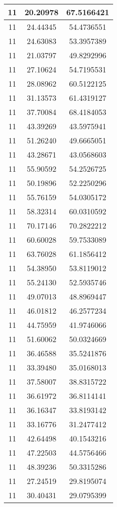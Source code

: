 \documentclass[
]{book}
\begin{document}
\begin{tabular}{c|c|c}
\hline
11 & 20.20978 & 67.5166421\\
\hline
11 & 24.44345 & 54.4736551\\
\hline
11 & 24.63083 & 53.3957389\\
\hline
11 & 21.03797 & 49.8292996\\
\hline
11 & 27.10624 & 54.7195531\\
\hline
11 & 28.08962 & 60.5122125\\
\hline
11 & 31.13573 & 61.4319127\\
\hline
11 & 37.70084 & 68.4184053\\
\hline
11 & 43.39269 & 43.5975941\\
\hline
11 & 51.26240 & 49.6665051\\
\hline
11 & 43.28671 & 43.0568603\\
\hline
11 & 55.90592 & 54.2526725\\
\hline
11 & 50.19896 & 52.2250296\\
\hline
11 & 55.76159 & 54.0305172\\
\hline
11 & 58.32314 & 60.0310592\\
\hline
11 & 70.17146 & 70.2822212\\
\hline
11 & 60.60028 & 59.7533089\\
\hline
11 & 63.76028 & 61.1856412\\
\hline
11 & 54.38950 & 53.8119012\\
\hline
11 & 55.24130 & 52.5935746\\
\hline
11 & 49.07013 & 48.8969447\\
\hline
11 & 46.01812 & 46.2577234\\
\hline
11 & 44.75959 & 41.9746066\\
\hline
11 & 51.60062 & 50.0324669\\
\hline
11 & 36.46588 & 35.5241876\\
\hline
11 & 33.39480 & 35.0168013\\
\hline
11 & 37.58007 & 38.8315722\\
\hline
11 & 36.61972 & 36.8114141\\
\hline
11 & 36.16347 & 33.8193142\\
\hline
11 & 33.16776 & 31.2477412\\
\hline
11 & 42.64498 & 40.1543216\\
\hline
11 & 47.22503 & 44.5756466\\
\hline
11 & 48.39236 & 50.3315286\\
\hline
11 & 27.24519 & 29.8195074\\
\hline
11 & 30.40431 & 29.0795399\\

\end{tabular}
\end{document}
